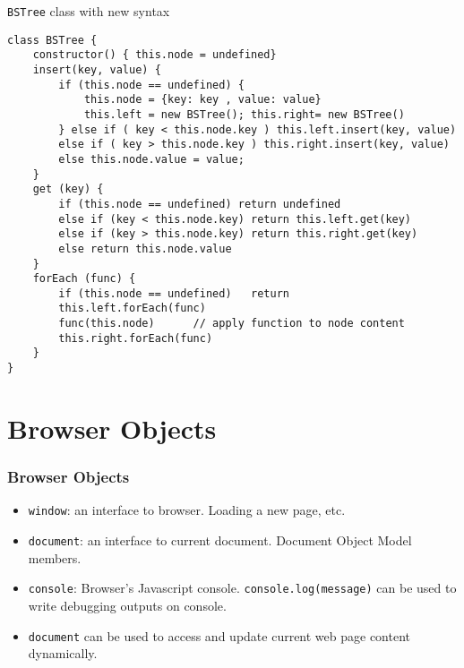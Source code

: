 \documentclass[trans,compress,xcolor=table]{beamer}
\begin{document}
\begin{frame}[fragile]
\lstinline!BSTree! class with new syntax
\begin{lstlisting}
class BSTree {
    constructor() { this.node = undefined}
	insert(key, value) {
    	if (this.node == undefined) {
        	this.node = {key: key , value: value}
        	this.left = new BSTree(); this.right= new BSTree()
    	} else if ( key < this.node.key ) this.left.insert(key, value)
    	else if ( key > this.node.key ) this.right.insert(key, value)
    	else this.node.value = value;                     
	}
	get (key) {
    	if (this.node == undefined) return undefined
    	else if (key < this.node.key) return this.left.get(key)
    	else if (key > this.node.key) return this.right.get(key)
    	else return this.node.value                     
	}
	forEach (func) {
    	if (this.node == undefined)   return
    	this.left.forEach(func)
    	func(this.node)      // apply function to node content
    	this.right.forEach(func)
	}
}
\end{lstlisting}
\end{frame}

\section{Browser Objects}
\begin{frame}[fragile]
\frametitle{Browser Objects}
\begin{itemize}
\item \lstinline!window!: an interface to browser. Loading a new page, etc.
\item \lstinline!document!: an interface to current document. Document Object Model members.
\item \lstinline!console!: Browser's Javascript console. 
\lstinline!console.log(message)! can be used to write debugging 
outputs on console.
\item \lstinline!document! can be used to access and update current
web page content dynamically.
\end{itemize}
\end{frame}
\end{document}
